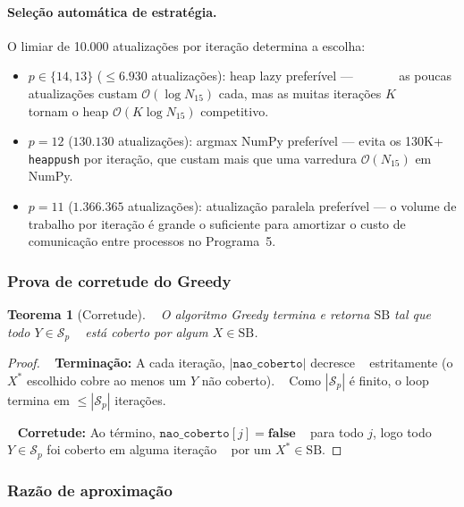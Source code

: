 \documentclass[12pt,a4paper]{article}
\newtheorem{theorem}{Teorema}[section]
\theoremstyle{definition}
\newcommand{\bigo}[1]{\mathcal{O}\!\left(#1\right)}
\newcommand{\SB}{\mathrm{SB}}
\begin{document}
\paragraph{Seleção automática de estratégia.}
O limiar de 10.000 atualizações por iteração determina a escolha:
\begin{itemize}
  \item $p \in \{14, 13\}$ ($\leq 6.930$ atualizações): heap lazy preferível —
        as poucas atualizações custam $\bigo{\log N_{15}}$ cada, mas as muitas iterações $K$
        tornam o heap $\bigo{K \log N_{15}}$ competitivo.
  \item $p=12$ ($130.130$ atualizações): argmax NumPy preferível —
        evita os 130K+ \texttt{heappush} por iteração, que custam mais que uma varredura
        $\bigo{N_{15}}$ em NumPy.
  \item $p=11$ ($1.366.365$ atualizações): atualização paralela preferível —
        o volume de trabalho por iteração é grande o suficiente para amortizar
        o custo de comunicação entre processos no Programa~5.
\end{itemize}

\subsubsection*{Prova de corretude do Greedy}

\begin{theorem}[Corretude]\label{thm:greedy-correctness}
  O algoritmo Greedy termina e retorna $\SB$ tal que todo $Y \in \mathcal{S}_p$
  está coberto por algum $X \in \SB$.
\end{theorem}
\begin{proof}
  \textbf{Terminação:} A cada iteração, $|\texttt{nao\_coberto}|$ decresce
  estritamente (o $X^*$ escolhido cobre ao menos um $Y$ não coberto).
  Como $|\mathcal{S}_p|$ é finito, o loop termina em $\leq |\mathcal{S}_p|$ iterações.

  \textbf{Corretude:} Ao término, $\texttt{nao\_coberto}[j] = \mathbf{false}$
  para todo $j$, logo todo $Y \in \mathcal{S}_p$ foi coberto em alguma iteração
  por um $X^* \in \SB$. \qedhere
\end{proof}

\subsubsection*{Razão de aproximação}
\end{document}
